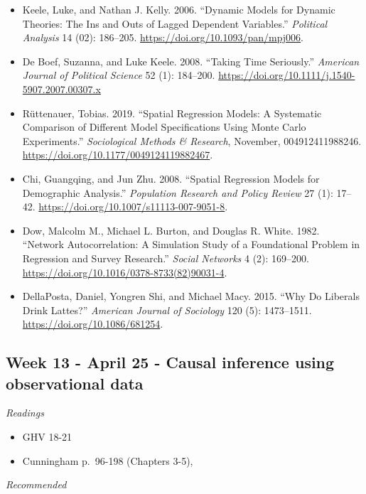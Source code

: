 \documentclass[
  10pt,
]{article}
\providecommand{\tightlist}{%
  \setlength{\itemsep}{0pt}\setlength{\parskip}{0pt}}
\begin{document}
\begin{itemize}
\tightlist
\item
  Keele, Luke, and Nathan J. Kelly. 2006. ``Dynamic Models for Dynamic
  Theories: The Ins and Outs of Lagged Dependent Variables.''
  \emph{Political Analysis} 14 (02): 186--205.
  \url{https://doi.org/10.1093/pan/mpj006}.
\item
  De Boef, Suzanna, and Luke Keele. 2008. ``Taking Time Seriously.''
  \emph{American Journal of Political Science} 52 (1): 184--200.
  \url{https://doi.org/10.1111/j.1540-5907.2007.00307.x}
\item
  Rüttenauer, Tobias. 2019. ``Spatial Regression Models: A Systematic
  Comparison of Different Model Specifications Using Monte Carlo
  Experiments.'' \emph{Sociological Methods \& Research}, November,
  004912411988246. \url{https://doi.org/10.1177/0049124119882467}.
\item
  Chi, Guangqing, and Jun Zhu. 2008. ``Spatial Regression Models for
  Demographic Analysis.'' \emph{Population Research and Policy Review}
  27 (1): 17--42. \url{https://doi.org/10.1007/s11113-007-9051-8}.
\item
  Dow, Malcolm M., Michael L. Burton, and Douglas R. White. 1982.
  ``Network Autocorrelation: A Simulation Study of a Foundational
  Problem in Regression and Survey Research.'' \emph{Social Networks} 4
  (2): 169--200. \url{https://doi.org/10.1016/0378-8733(82)90031-4}.
\item
  DellaPosta, Daniel, Yongren Shi, and Michael Macy. 2015. ``Why Do
  Liberals Drink Lattes?'' \emph{American Journal of Sociology} 120 (5):
  1473--1511. \url{https://doi.org/10.1086/681254}.
\end{itemize}

\hypertarget{week-13---april-25---causal-inference-using-observational-data}{%
\subsection{Week 13 - April 25 - Causal inference using observational
data}\label{week-13---april-25---causal-inference-using-observational-data}}

\emph{Readings}

\begin{itemize}
\tightlist
\item
  GHV 18-21
\item
  Cunningham p.~96-198 (Chapters 3-5),
\end{itemize}

\emph{Recommended}
\end{document}
